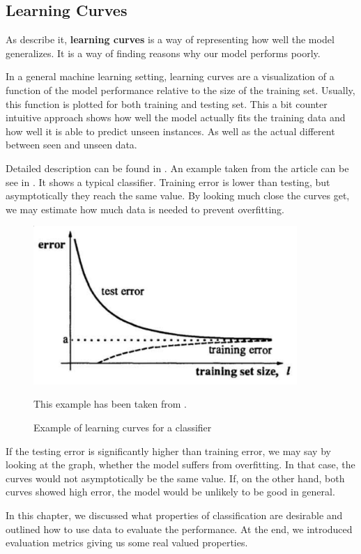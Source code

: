 

\subsection{Learning Curves}\label{sec:lcurves}

As \citet{sammut2011encyclopedia} describe it,
\textbf{learning curves} is a way of representing how well the model  generalizes.
It is a way of finding reasons why our model performs poorly.

In a general machine learning setting, learning curves are a visualization of a function
of the model performance relative to the size of the training set.
Usually, this function is plotted for both training and testing set.
This a bit counter intuitive approach shows how well the model
actually fits the training data and how well it is able to predict unseen instances.
As well as the actual different between seen and unseen data.

Detailed description can be found in \citet{cortes1994learning}.
An example taken from the article can be see in .
It shows a typical classifier.
Training error is lower than testing, but asymptotically they reach the same value.
By looking much close the curves get, we may estimate how much data is needed
to prevent overfitting.


\begin{figure}[ht]\centering
\includegraphics[width=100mm]{../img/learning_curves_example.png}
\caption{Example of learning curves for a classifier}
This example has been taken from \citet{cortes1994learning}.
\label{fig:l_c_ex}
\end{figure}


If the testing error is significantly higher than training error,
we may say by looking at the graph, whether
the model suffers from overfitting.
In that case, the curves would not asymptotically be the same value.
If, on the other hand, both curves showed high error,
the model would be unlikely to be good in general.


In this chapter, we discussed what properties of classification are desirable
and outlined how to use data to evaluate the performance.
At the end, we introduced evaluation metrics giving us some real valued properties.
